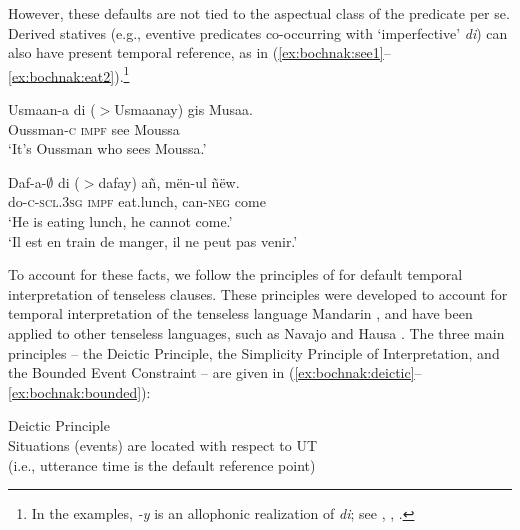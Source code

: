 \documentclass[output=paper,newtxmath,modfonts,nonflat,draftmode]{langsci/langscibook}
\begin{document}
However, these defaults are not tied to the aspectual class of the predicate
per se. Derived statives (e.g., eventive predicates co-occurring with
`imperfective'  \textit{di}) can also have present temporal reference,
as in (\ref{ex:bochnak:see1}--\ref{ex:bochnak:eat2}).\footnote{In the examples, \textit{-y} is
an allophonic realization of \textit{di}; see \citealt{Dunigan1994}, \cite{Torrence2005, torrence12clause}, \cite{Martinovic2015b}.}



\ea
\gll Usmaan-a {di ($>$Usmaanay)} gis Musaa. \\
Oussman-\textsc{c} \textsc{impf} see Moussa \\
\glt `It's Oussman who sees Moussa.'\label{ex:bochnak:see1}
\z

\ea
\gll Daf-a-$\emptyset$ {di ($>$dafay)} a\~n, m\"en-ul \~n\"ew.\\
do-\textsc{c}-\textsc{scl.3sg} \textsc{impf} eat.lunch, can-\textsc{neg} come\\
\glt `He is eating lunch, he cannot come.'\\
`Il est en train de manger, il ne peut pas venir.'\hfill\citep[263]{robert91approche}\label{ex:bochnak:eat2}
\z




To account for these facts, we follow the principles of \citet{smith05temporal, smith07time} for default temporal interpretation of tenseless clauses. These principles were developed to account for temporal interpretation of the tenseless language Mandarin \citep{smith05temporal}, and have been applied to other tenseless languages, such as Navajo \citep{smith07time} and Hausa \citep{mucha13temporal}. The three main principles -- the Deictic Principle, the Simplicity Principle of Interpretation, and the Bounded Event Constraint -- are given in (\ref{ex:bochnak:deictic}--\ref{ex:bochnak:bounded}):

\ea\label{ex:bochnak:deictic} {Deictic Principle} \\ Situations (events) are located with respect to UT \\(i.e., utterance time is the default reference point)
\z
\end{document}
